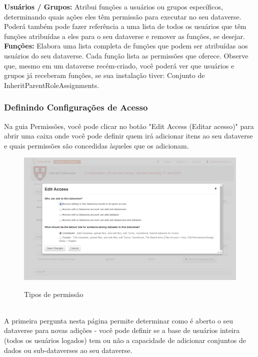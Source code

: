 \documentclass[12pt,hidelinks]{article}
\begin{document}
\textbf{Usuários / Grupos:} Atribui funções a usuários ou grupos específicos, determinando quais ações eles têm permissão para executar no seu dataverse. Poderá também pode fazer referência a uma lista de todos os usuários que têm funções atribuídas a eles para o seu dataverse e remover as funções, se desejar.\\

\textbf{Funções:} Elabora uma lista completa de funções que podem ser atribuídas aos usuários do seu dataverse. Cada função lista as permissões que oferece. Observe que, mesmo em um dataverse recém-criado, você poderá ver que usuários e grupos já receberam funções, se sua instalação tiver: Conjunto de InheritParentRoleAssignments.

        \subsubsection{Definindo Configurações de Acesso}
        
\qquad Na guia Permissões, você pode clicar no botão "Edit Access (Editar acesso)" para abrir uma caixa onde você pode definir quem irá adicionar itens ao seu dataverse e quais permissões são concedidas àqueles que os adicionam.
        
  \begin{figure}[H]
  \caption{Tipos de permissão}
         \centering
    \includegraphics[scale=0.4]{prt3.png}
    \label{Acesso}
    \end{figure}
  \\
  
 A primeira pergunta nesta página permite determinar como é aberto o seu dataverse para novas adições - você pode definir se a base de usuários inteira (todos os usuários logados) tem ou não a capacidade de adicionar conjuntos de dados ou sub-dataverses ao seu dataverse.
\end{document}
